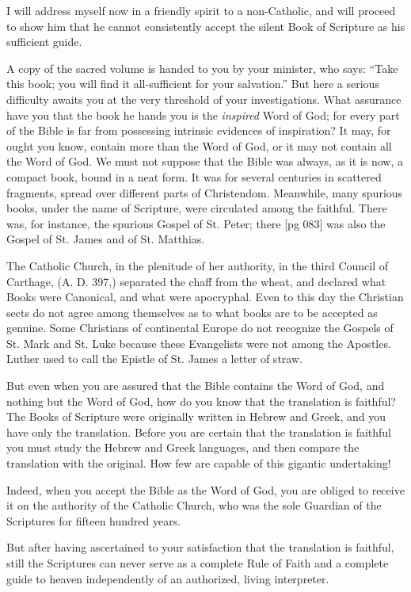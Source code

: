I will address myself now in a friendly spirit
to a non-Catholic, and will proceed to show him
that he cannot consistently accept the silent Book
of Scripture as his sufficient guide.

A copy of the sacred volume is handed to you
by your minister, who says: “Take this book;
you will find it all-sufficient for your salvation.”
But here a serious difficulty awaits you at the very
threshold of your investigations. What assurance
have you that the book he hands you is the
\emph{inspired} Word of God; for every part of the Bible
is far from possessing intrinsic evidences of inspiration?
It may, for ought you know, contain
more than the Word of God, or it may not contain
all the Word of God. We must not suppose
that the Bible was always, as it is now, a compact
book, bound in a neat form. It was for several
centuries in scattered fragments, spread over different
parts of Christendom. Meanwhile, many
spurious books, under the name of Scripture, were
circulated among the faithful. There was, for instance,
the spurious Gospel of St. Peter; there
[pg 083]
was also the Gospel of St. James and of St.
Matthias.

The Catholic Church, in the plenitude of her
authority, in the third Council of Carthage, (A. D.
397,) separated the chaff from the wheat, and
declared what Books were Canonical, and what
were apocryphal. Even to this day the Christian
sects do not agree among themselves as to what
books are to be accepted as genuine. Some Christians
of continental Europe do not recognize the
Gospels of St. Mark and St. Luke because these
Evangelists were not among the Apostles. Luther
used to call the Epistle of St. James a letter of
straw.

But even when you are assured that the Bible
contains the Word of God, and nothing but the
Word of God, how do you know that the translation
is faithful? The Books of Scripture were
originally written in Hebrew and Greek, and you
have only the translation. Before you are certain
that the translation is faithful you must
study the Hebrew and Greek languages, and then
compare the translation with the original. How
few are capable of this gigantic undertaking!

Indeed, when you accept the Bible as the Word
of God, you are obliged to receive it on the authority
of the Catholic Church, who was the sole
Guardian of the Scriptures for fifteen hundred
years.

But after having ascertained to your satisfaction
that the translation is faithful, still the Scriptures
can never serve as a complete Rule of Faith
and a complete guide to heaven independently of
an authorized, living interpreter.

